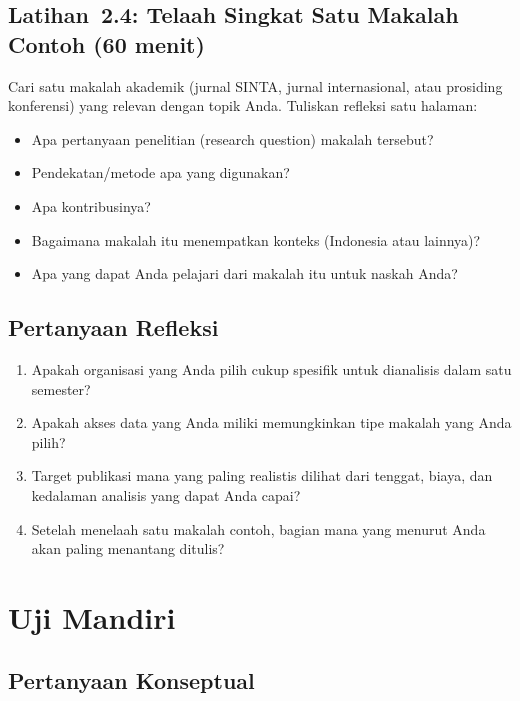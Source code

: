 \subsection*{Latihan~2.4: Telaah Singkat Satu Makalah Contoh (60 menit)}

Cari satu makalah akademik (jurnal SINTA, jurnal internasional, atau prosiding
konferensi) yang relevan dengan topik Anda. Tuliskan refleksi satu halaman:

\begin{itemize}
  \item Apa pertanyaan penelitian (research question) makalah tersebut?
  \item Pendekatan/metode apa yang digunakan?
  \item Apa kontribusinya?
  \item Bagaimana makalah itu menempatkan konteks (Indonesia atau lainnya)?
  \item Apa yang dapat Anda pelajari dari makalah itu untuk naskah Anda?
\end{itemize}

\subsection*{Pertanyaan Refleksi}

\begin{enumerate}
  \item Apakah organisasi yang Anda pilih cukup spesifik untuk dianalisis
        dalam satu semester?
  \item Apakah akses data yang Anda miliki memungkinkan tipe makalah yang
        Anda pilih?
  \item Target publikasi mana yang paling realistis dilihat dari tenggat,
        biaya, dan kedalaman analisis yang dapat Anda capai?
  \item Setelah menelaah satu makalah contoh, bagian mana yang menurut Anda
        akan paling menantang ditulis?
\end{enumerate}

\section{Uji Mandiri}

\subsection*{Pertanyaan Konseptual}

